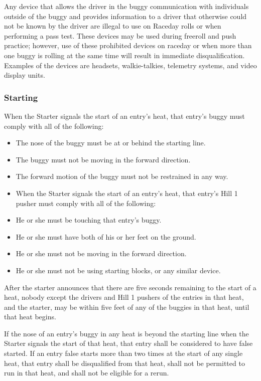 Any device that allows the driver in the buggy communication with individuals outside of the buggy and provides information to a driver that otherwise could not be known by the driver are illegal to use on Raceday rolls or when performing a pass test. These devices may be used during freeroll and push practice; however, use of these prohibited devices on raceday or when more than one buggy is rolling at the same time will result in immediate disqualification. Examples of the devices are headsets, walkie-talkies, telemetry systems, and video display units.

\subsubsection{Starting}

When the Starter signals the start of an entry's heat, that entry's buggy must comply with all of the following:
\begin{itemize}
	\item The nose of the buggy must be at or behind the starting line.
	\item The buggy must not be moving in the forward direction.
	\item The forward motion of the buggy must not be restrained in any way.
	\item When the Starter signals the start of an entry's heat, that entry's Hill 1 pusher must comply with all of the following:
	\item He or she must be touching that entry's buggy.
	\item He or she must have both of his or her feet on the ground.
	\item He or she must not be moving in the forward direction.
	\item He or she must not be using starting blocks, or any similar device.
\end{itemize}

After the starter announces that there are five seconds remaining to the start of a heat, nobody except the drivers and Hill 1 pushers of the entries in that heat, and the starter, may be within five feet of any of the buggies in that heat, until that heat begins.

If the nose of an entry's buggy in any heat is beyond the starting line when the Starter signals the start of that heat, that entry shall be considered to have false started. If an entry false starts more than two times at the start of any single heat, that entry shall be disqualified from that heat, shall not be permitted to run in that heat, and shall not be eligible for a rerun.

